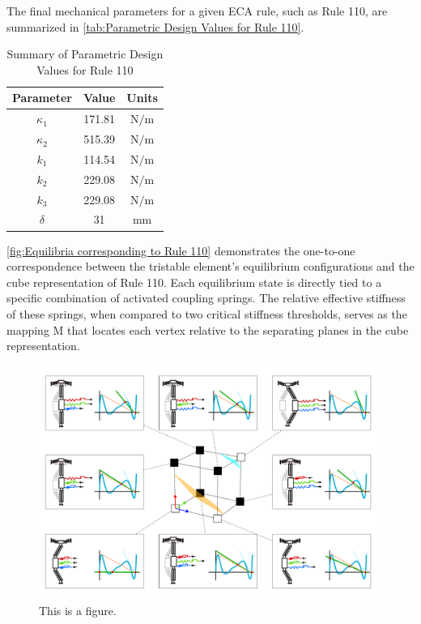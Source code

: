The final mechanical parameters for a given ECA rule, such as Rule 110, are summarized in \autoref*{tab:Parametric Design Values for Rule 110}.

\begin{table}[h]
\centering
\begin{tabular}{|c|c|c|}
\hline
Parameter & Value & Units \\
\hline
\( \kappa_1 \) & 171.81 & \( \text{N/m} \) \\
\( \kappa_2 \) & 515.39 & \( \text{N/m} \) \\
\( k_1 \) & 114.54 & \( \text{N/m} \) \\
\( k_2 \) & 229.08 & \( \text{N/m} \) \\
\( k_3 \) & 229.08 & \( \text{N/m} \) \\
\( \delta \) & 31 & \( \text{mm} \) \\
\hline
\end{tabular}
\caption{Summary of Parametric Design Values for Rule 110}
\label{tab:Parametric Design Values for Rule 110}
\end{table}

\autoref*{fig:Equilibria corresponding to Rule 110} demonstrates the one-to-one correspondence between the tristable element's equilibrium configurations and the cube representation of Rule 110. Each equilibrium state is directly tied to a specific combination of activated coupling springs. The relative effective stiffness of these springs, when compared to two critical stiffness thresholds, serves as the mapping M that locates each vertex relative to the separating planes in the cube representation.
\begin{figure}[H]
    \centering
    \includegraphics[width=\textwidth]{images/SVGs/Equilibria3.pdf}
    \caption{This is a figure.}
    \label{fig:Equilibria corresponding to Rule 110}
\end{figure}


